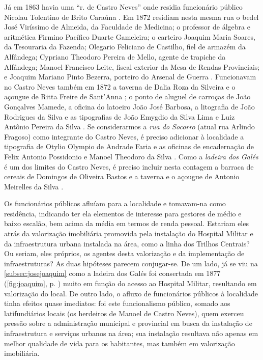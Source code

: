 Já em 1863 havia uma ``r. de Castro Neves'' onde residia funcionário público Nicolau Tolentino de Brito Caraúna \cite[p.~125]{masson_almanak_1863}. Em 1872 residiam nesta mesma rua o bedel José Viríssimo de Almeida, da Faculdade de Medicina; o professor de álgebra e aritmética Firmino Pacífico Duarte Gameleira; o carteiro Joaquim Maria Soares, da Tesouraria da Fazenda; Olegario Feliciano de Castilho, fiel de armazém da Alfândega; Cypriano Theodoro Pereira de Mello, agente de trapiche da Alfândega; Manoel Francisco Leite, fiscal exterior da Mesa de Rendas Provinciais; e Joaquim Mariano Pinto Bezerra, porteiro do Arsenal de Guerra \cite[segunda~parte, pp.~94, 96, 167, 170, 184, 194]{pimenta_almanak_1872}. Funcionavam no Castro Neves também em 1872 a taverna de Dalia Roza da Silveira e o açougue de Ritta Freire de Sant'Anna \cite[terceira~parte, pp.~41, 54]{pimenta_almanak_1872}; o ponto de aluguel de carroças de João Gonçalves Mamede, a oficina do latoeiro João José Barbosa, a litografia de João Rodrigues da Silva e as tipografias de João Emygdio da Silva Lima e Luiz Antônio Pereira da Silva \cite[quarta parte, pp.~20, 32, 36, 38]{pimenta_almanak_1872}. Se considerarmos a \textit{rua do Socorro} (atual rua Arlindo Fragoso) como integrante do Castro Neves, é preciso adicionar à localidade a tipografia de Otylio Olympio de Andrade Faria e as oficinas de encadernação de Felix Antonio Possidonio e Manoel Theodoro da Silva \cite[quarta parte, pp.~38, 39]{pimenta_almanak_1872}. Como a \textit{ladeira dos Galés} é um dos limites do Castro Neves, é preciso incluir nesta contagem a barraca de cereais de Domingos de Oliveira Bastos e a taverna e o açougue de Antonio Meirelles da Silva \cite[terceira~parte, pp.~39, 53, 56]{pimenta_almanak_1872}.

Os funcionários públicos afluíam para a localidade e tomavam-na como residência, indicando ter ela elementos de interesse para gestores de médio e baixo escalão, bem acima da média em termos de renda pessoal. Estariam eles atrás da valorização imobiliária promovida pela instalação do Hospital Militar e da infraestrutura urbana instalada na área, como a linha dos Trilhos Centrais? Ou seriam, eles próprios, os agentes desta valorização e da implementação de infraestruturas? As duas hipóteses parecem conjugar-se. De um lado, já se viu na \autoref{subsec:josejoaquim} como a ladeira dos Galés foi consertada em 1877 (\autoref{fig:joaquim}, p. \pageref{fig:joaquim}) muito em função do acesso ao Hospital Militar, resultando em valorização do local. De outro lado, o afluxo de funcionários públicos à localidade tinha efeitos quase imediatos: foi este funcionalismo público, somado aos latifundiários locais (os herdeiros de Manoel de Castro Neves), quem exerceu pressão sobre a administração municipal e provincial em busca da instalação de infraestrutura e serviços urbanos na área; sua instalação resultava não apenas em melhor qualidade de vida para os habitantes, mas também em valorização imobiliária. 

